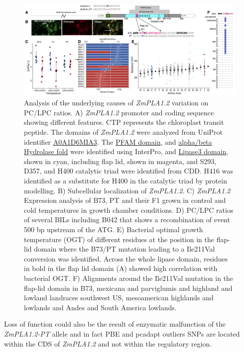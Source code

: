 \documentclass[9pt,twocolumn,twoside]{BioRxiv}
\begin{document}
\begin{figure}[ht]
\begin{center}
\includegraphics[width=0.8\paperwidth]{Figures/Fig_4.png}
\caption{Analysis of the underlying causes of \textit{ZmPLA1.2} variation on PC/LPC ratios.    
A) \textit{ZmPLA1.2} promoter and coding sequence showing different features. CTP represents the chloroplast transit peptide. The domains of \textit{ZmPLA1.2} were analyzed from UniProt identifier \hyperlink{https://www.uniprot.org/uniprot/A0A1D6MIA3}{A0A1D6MIA3}. The \hyperlink{https://www.ebi.ac.uk/interpro/entry/pfam/PF01764/}{PFAM domain}, and \hyperlink{https://www.ebi.ac.uk/interpro/entry/InterPro/IPR029058/}{alpha/beta Hydrolase fold} were identified using InterPro, and \hyperlink{https://www.ncbi.nlm.nih.gov/Structure/cdd/cddsrv.cgi?uid=cd00519}{Lipase3 domain}, shown in cyan, including flap lid, shown in magenta, and S293, D357, and H400 catalytic triad were identified from CDD. H416 was identified as a substitute for H400 in the catalytic triad by protein modelling.
B) Subcellular localization of \textit{ZmPLA1.2}.
C) \textit{ZmPLA1.2} Expression analysis of B73, PT and their F1 grown in control and cold temperatures in growth chamber conditions. 
D) PC/LPC ratios of several BILs including B042 that shows a recombination of event 500 bp upstream of the ATG.
E) Bacterial optimal growth temperature (OGT) of different residues at the position in the flap-lid domain where the B73/PT mutation leading to a Ile211Val conversion was identified. Across the whole lipase domain, residues in bold in the flap lid domain (A) showed high correlation with bacterial OGT. 
F) Alignments around the Ile211Val mutation in the flap-lid domain in B73, mexicana and parviglumis and highland and lowland landraces southwest US, mesoamerican highlands and lowlands and Andes and South America lowlands. 
} 
\label{Fig4}
\end{center}
\end{figure} 
Loss of function could also be the result of enzymatic malfunction of the \textit{ZmPLA1.2-PT} allele and in fact PBE and pcadapt outliers SNPs are located within the CDS of \textit{ZmPLA1.2} and not within the regulatory region. 
\end{document}
